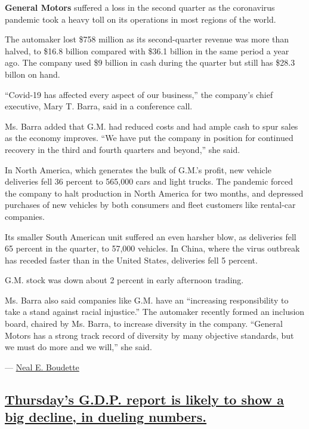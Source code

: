 \textbf{General Motors} suffered a loss in the second quarter as the
coronavirus pandemic took a heavy toll on its operations in most regions
of the world.

The automaker lost \$758 million as its second-quarter revenue was more
than halved, to \$16.8 billion compared with \$36.1 billion in the same
period a year ago. The company used \$9 billion in cash during the
quarter but still has \$28.3 billon on hand.

``Covid-19 has affected every aspect of our business,'' the company's
chief executive, Mary T. Barra, said in a conference call.

Ms. Barra added that G.M. had reduced costs and had ample cash to spur
sales as the economy improves. ``We have put the company in position for
continued recovery in the third and fourth quarters and beyond,'' she
said.

In North America, which generates the bulk of G.M.'s profit, new vehicle
deliveries fell 36 percent to 565,000 cars and light trucks. The
pandemic forced the company to halt production in North America for two
months, and depressed purchases of new vehicles by both consumers and
fleet customers like rental-car companies.

Its smaller South American unit suffered an even harsher blow, as
deliveries fell 65 percent in the quarter, to 57,000 vehicles. In China,
where the virus outbreak has receded faster than in the United States,
deliveries fell 5 percent.

G.M. stock was down about 2 percent in early afternoon trading.

Ms. Barra also said companies like G.M. have an ``increasing
responsibility to take a stand against racial injustice.'' The automaker
recently formed an inclusion board, chaired by Ms. Barra, to increase
diversity in the company. ``General Motors has a strong track record of
diversity by many objective standards, but we must do more and we
will,'' she said.

--- \href{https://www.nytimes.com/by/neal-e-boudette}{Neal E. Boudette}

\hypertarget{thursdays-gdp-report-is-likely-to-show-a-big-decline-in-dueling-numbers}{%
\subsection{\texorpdfstring{\protect\hyperlink{thursdays-gdp-report-is-likely-to-show-a-big-decline-in-dueling-numbers}{Thursday's
G.D.P. report is likely to show a big decline, in dueling
numbers.}}{Thursday's G.D.P. report is likely to show a big decline, in dueling numbers.}}\label{thursdays-gdp-report-is-likely-to-show-a-big-decline-in-dueling-numbers}}

